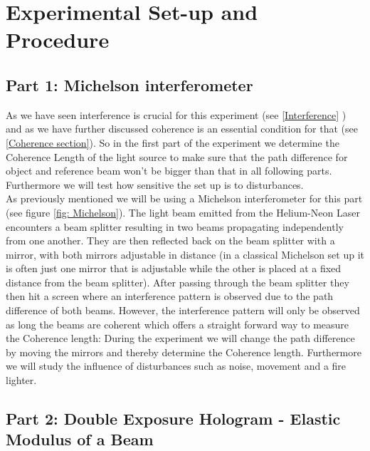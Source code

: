 \section{Experimental Set-up and Procedure}

\subsection{Part 1: Michelson interferometer}\label{sec:michelson}

As we have seen interference is crucial for this experiment (see \ref{Interference} ) and as we have further discussed coherence is an essential condition for that (see \ref{Coherence section}). So in the first part of the experiment we determine the Coherence Length of the light source to make sure that the path difference for object and reference beam won't be bigger than that in all following parts. Furthermore we will test how sensitive the set up is to disturbances.\\
As previously mentioned we will be using a Michelson interferometer for this part (see figure \ref{fig: Michelson}). The light beam emitted from the Helium-Neon Laser encounters a beam splitter resulting in two beams propagating independently from one another. They are then reflected back on the beam splitter with a mirror, with both mirrors adjustable in distance (in a classical Michelson set up it is often just one mirror that is adjustable while the other is placed at a fixed distance from the beam splitter). After passing through the beam splitter they then hit a screen where an interference pattern is observed due to the path difference of both beams. However, the interference pattern will only be observed as long the beams are coherent which offers a straight forward way to measure the Coherence length: During the experiment we will change the path difference by moving the mirrors and thereby determine the Coherence length. Furthermore we will study the influence of disturbances such as noise, movement and a fire lighter.




\subsection{Part 2: Double Exposure Hologram - Elastic Modulus of a Beam \label{DEH}}

